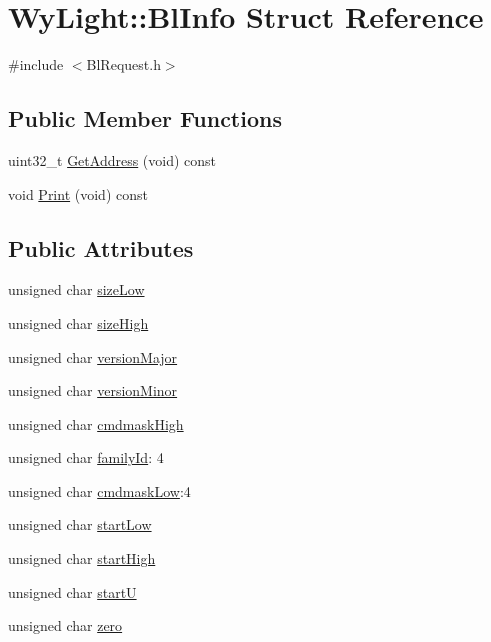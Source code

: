 \hypertarget{struct_wy_light_1_1_bl_info}{\section{Wy\-Light\-:\-:Bl\-Info Struct Reference}
\label{struct_wy_light_1_1_bl_info}
}


{\ttfamily \#include $<$Bl\-Request.\-h$>$}

\subsection*{Public Member Functions}
\begin{DoxyCompactItemize}
\item 
uint32\-\_\-t \hyperlink{struct_wy_light_1_1_bl_info_a93505c5f081c862b51e1f0dc746b6f0a}{Get\-Address} (void) const 
\item 
void \hyperlink{struct_wy_light_1_1_bl_info_a8567ca010c4dfac79426c44eeca2369a}{Print} (void) const 
\end{DoxyCompactItemize}
\subsection*{Public Attributes}
\begin{DoxyCompactItemize}
\item 
unsigned char \hyperlink{struct_wy_light_1_1_bl_info_a0fdc843fbc878f3570751ef38fa69e0e}{size\-Low}
\item 
unsigned char \hyperlink{struct_wy_light_1_1_bl_info_a95dfd12b33d938d0130d1e3326f9d711}{size\-High}
\item 
unsigned char \hyperlink{struct_wy_light_1_1_bl_info_a225c43b9cc621dd383ca22695098f2a6}{version\-Major}
\item 
unsigned char \hyperlink{struct_wy_light_1_1_bl_info_a416fdd8a8cd832aca5f6f6ae851d91ff}{version\-Minor}
\item 
unsigned char \hyperlink{struct_wy_light_1_1_bl_info_a6dfdd03e93374830817109e096103b69}{cmdmask\-High}
\item 
unsigned char \hyperlink{struct_wy_light_1_1_bl_info_a716367b951d25272fc9f95324e10fa73}{family\-Id}\-: 4
\item 
unsigned char \hyperlink{struct_wy_light_1_1_bl_info_a7ebeda2077accbc4de2305114efb6f4b}{cmdmask\-Low}\-:4
\item 
unsigned char \hyperlink{struct_wy_light_1_1_bl_info_a7a53fd44ef6def50cbffdc519190961d}{start\-Low}
\item 
unsigned char \hyperlink{struct_wy_light_1_1_bl_info_adaaa62eb1ad8fee73cb2503222e7b905}{start\-High}
\item 
unsigned char \hyperlink{struct_wy_light_1_1_bl_info_a9d435ba3c8d9b530b3fcbf70c358e72c}{start\-U}
\item 
unsigned char \hyperlink{struct_wy_light_1_1_bl_info_a824d4777a879a587bee8c68461226883}{zero}
\end{DoxyCompactItemize}


